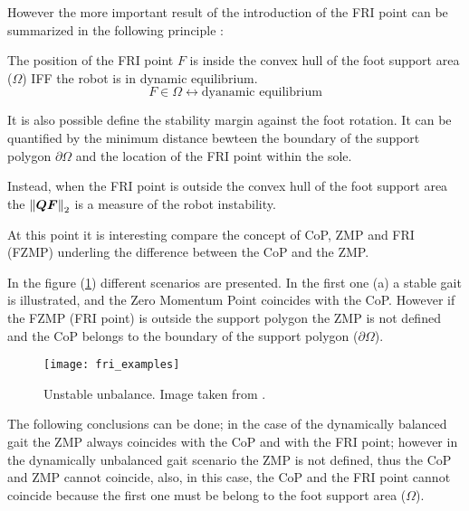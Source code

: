 However the more important result of the introduction of the FRI point can be summarized in the
following principle \cite{Goswami1999}:
\begin{principle}
  The position of the FRI point $F$ is inside the convex hull of the foot support area ($\Omega$)
  IFF the robot is in dynamic equilibrium.
  \[
  F \in \Omega \longleftrightarrow \text{dyanamic equilibrium}
  \]
  \par
  It is also possible define the stability margin against the foot rotation.
  It can be  quantified by the minimum distance bewteen the boundary of the support polygon
  $\partial \Omega$ and the location of the FRI point within the sole.
  \par
  Instead, when the FRI point is outside the convex hull of the foot support area the
  $\left\lVert\boldsymbol{QF}\right\rVert_2$ is a measure of the robot instability.
\end{principle}
At this point it is interesting compare the concept of CoP, ZMP and FRI (FZMP)
underling the difference between the CoP and the ZMP.
\par
In the figure (\ref{fig:fri_example}) different scenarios are presented. In the first one (a) a
stable gait is illustrated, and the Zero Momentum Point coincides with the CoP. However if
the FZMP (FRI point) is outside the support polygon the ZMP is not defined and the CoP belongs
to the boundary of the support polygon ($\partial \Omega$).
\begin{figure}[!ht]
  \centering
  \texttt{[image: fri\_examples]}
  \caption{Unstable unbalance. Image taken from \cite{Vukobratov2004}. \label{fig:fri_example}}
\end{figure}
The following conclusions can be done; in the case of the dynamically balanced gait the ZMP always
coincides with the CoP and with the FRI point;
however in the dynamically unbalanced gait scenario the ZMP is not defined, thus the CoP and
ZMP cannot coincide, also, in this case, the CoP and the FRI point cannot coincide because the
first one must be belong to the foot support area ($\Omega$).
\newpage
